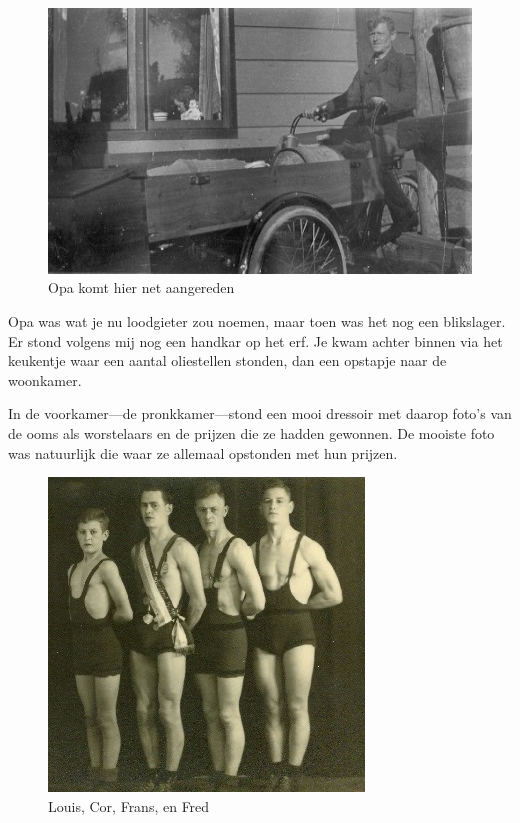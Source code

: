 \documentclass[12pt,twoside]{memoir}
\begin{document}
\begin{figure}
\includegraphics[width=\textwidth]{img/ch3/opakriek2}
\caption*{\footnotesize Opa komt hier net aangereden}
\end{figure}

Opa was wat je nu loodgieter zou noemen, maar toen was het nog een blikslager. Er stond volgens mij nog een handkar op het erf. Je kwam achter binnen via het keukentje waar een aantal oliestellen stonden, dan een opstapje naar de woonkamer. 

In de voorkamer---de pronkkamer---stond een mooi dressoir met daarop foto’s van de ooms als worstelaars en de prijzen die ze hadden gewonnen. De mooiste foto was natuurlijk die waar ze allemaal opstonden met hun prijzen. 

\begin{figure}
\includegraphics[width=\textwidth]{img/ch3/Louiscorfransfred}
\caption*{\footnotesize Louis, Cor, Frans, en Fred}
\end{figure}
\end{document}
